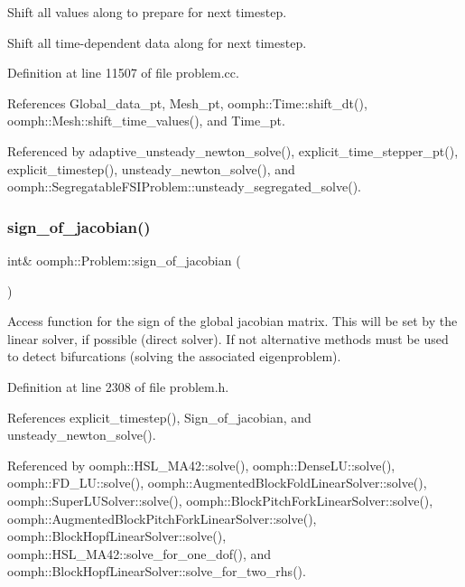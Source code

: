 Shift all values along to prepare for next timestep. 

Shift all time-\/dependent data along for next timestep. 

Definition at line 11507 of file problem.\+cc.



References Global\+\_\+data\+\_\+pt, Mesh\+\_\+pt, oomph\+::\+Time\+::shift\+\_\+dt(), oomph\+::\+Mesh\+::shift\+\_\+time\+\_\+values(), and Time\+\_\+pt.



Referenced by adaptive\+\_\+unsteady\+\_\+newton\+\_\+solve(), explicit\+\_\+time\+\_\+stepper\+\_\+pt(), explicit\+\_\+timestep(), unsteady\+\_\+newton\+\_\+solve(), and oomph\+::\+Segregatable\+F\+S\+I\+Problem\+::unsteady\+\_\+segregated\+\_\+solve().

\mbox{\label{classoomph_1_1Problem_a797cb28b5fffe976fc7541421eb423a1}} 
\subsubsection{\texorpdfstring{sign\+\_\+of\+\_\+jacobian()}{sign\_of\_jacobian()}}
{\footnotesize\ttfamily int\& oomph\+::\+Problem\+::sign\+\_\+of\+\_\+jacobian (\begin{DoxyParamCaption}{ }\end{DoxyParamCaption})\hspace{0.3cm}{\ttfamily [inline]}}



Access function for the sign of the global jacobian matrix. This will be set by the linear solver, if possible (direct solver). If not alternative methods must be used to detect bifurcations (solving the associated eigenproblem). 



Definition at line 2308 of file problem.\+h.



References explicit\+\_\+timestep(), Sign\+\_\+of\+\_\+jacobian, and unsteady\+\_\+newton\+\_\+solve().



Referenced by oomph\+::\+H\+S\+L\+\_\+\+M\+A42\+::solve(), oomph\+::\+Dense\+L\+U\+::solve(), oomph\+::\+F\+D\+\_\+\+L\+U\+::solve(), oomph\+::\+Augmented\+Block\+Fold\+Linear\+Solver\+::solve(), oomph\+::\+Super\+L\+U\+Solver\+::solve(), oomph\+::\+Block\+Pitch\+Fork\+Linear\+Solver\+::solve(), oomph\+::\+Augmented\+Block\+Pitch\+Fork\+Linear\+Solver\+::solve(), oomph\+::\+Block\+Hopf\+Linear\+Solver\+::solve(), oomph\+::\+H\+S\+L\+\_\+\+M\+A42\+::solve\+\_\+for\+\_\+one\+\_\+dof(), and oomph\+::\+Block\+Hopf\+Linear\+Solver\+::solve\+\_\+for\+\_\+two\+\_\+rhs().

